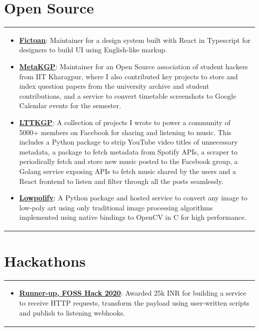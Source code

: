 \documentclass[a4paper,10pt]{extarticle} %
\begin{document}
\section{\textcolor{primary}{Open Source}}
\begin{tabularx}{\linewidth}{X}
\begin{itemize}[leftmargin=*, nosep, before=\vspace{-0.8\baselineskip}, after=\vspace{-1.0\baselineskip}]
    \item \textbf{\href{https://github.com/fictoan/fictoan-react}{Fictoan}}: Maintainer for a design system built with React in Typescript for designers to build UI using English-like markup.
    \item \textbf{\href{https://wiki.metakgp.org}{MetaKGP}}: Maintainer for an Open Source association of student hackers from IIT Kharagpur, where I also contributed key projects to store and index question papers from the university archive and student contributions, and a service to convert timetable screenshots to Google Calendar events for the semester.
    \item \textbf{\href{https://github.com/lttkgp}{LTTKGP}}: A collection of projects I wrote to power a community of 5000+ members on Facebook for sharing and listening to music. This includes a Python package to strip YouTube video titles of unnecessary metadata, a package to fetch metadata from Spotify APIs, a scraper to periodically fetch and store new music posted to the Facebook group, a Golang service exposing APIs to fetch music shared by the users and a React frontend to listen and filter through all the posts seamlessly.
    \item \textbf{\href{https://github.com/ghostwriternr/lowpolify}{Lowpolify}}: A Python package and hosted service to convert any image to low-poly art using only traditional image processing algorithms implemented using native bindings to OpenCV in C for high performance.
\end{itemize}
\end{tabularx}


\section{\textcolor{primary}{Hackathons}}
\begin{tabularx}{\linewidth}{X}
\begin{itemize}[leftmargin=*, nosep, before=\vspace{-0.8\baselineskip}, after=\vspace{-1.0\baselineskip}]
    \item \textbf{\href{https://forum.fossunited.org/t/foss-hack-2020-results}{Runner-up, FOSS Hack 2020}}: Awarded 25k INR for building a service to receive HTTP requests, transform the payload using user-written scripts and publish to listening webhooks.
\end{itemize}
\end{tabularx}
\end{document}
